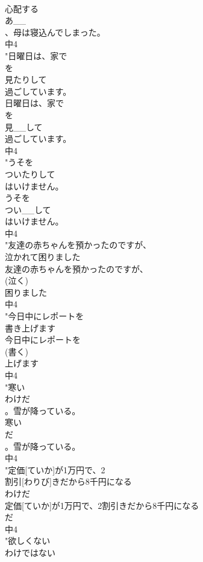 \documentclass[8pt]{extreport}
\begin{document}
\begin{CJK}{UTF8}{min}
\\	心配する
\\	あ__
\\	、母は寝込んでしまった。
\\	中4
\\	"日曜日は、家で
\\	を
\\	見たりして
\\	過ごしています。
\\	日曜日は、家で
\\	を
\\	見__して
\\	過ごしています。
\\	中4
\\	"うそを
\\	ついたりして
\\	はいけません。
\\	うそを
\\	つい__して
\\	はいけません。
\\	中4
\\	"友達の赤ちゃんを預かったのですが、
\\	泣かれて困りました
\\	友達の赤ちゃんを預かったのですが、
\\	(泣く)
\\	困りました
\\	中4
\\	"今日中にレポートを
\\	書き上げます
\\	今日中にレポートを
\\	(書く)
\\	上げます
\\	中4
\\	"寒い
\\	わけだ
\\	。雪が降っている。
\\	寒い
\\	だ
\\	。雪が降っている。
\\	中4
\\	"定価[ていか]が1万円で、2
\\	割引[わりび]きだから8千円になる
\\	わけだ
\\	定価[ていか]が1万円で、2割引きだから8千円になる
\\	だ
\\	中4
\\	"欲しくない
\\	わけではない

\end{CJK}
\end{document}
